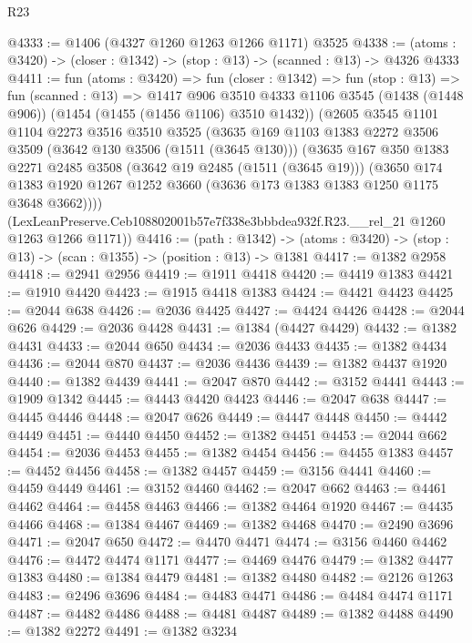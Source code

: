 \begin{lexlean}{R23}
\begin{coremodule}
@4333 := @1406 (@4327 @1260 @1263 @1266 @1171) @3525
@4338 := (atoms : @3420) -> (closer : @1342) -> (stop : @13) -> (scanned : @13) -> @4326 @4333
@4411 := fun (atoms : @3420) =>
  fun (closer : @1342) =>
  fun (stop : @13) =>
  fun (scanned : @13) =>
  @1417
    @906
    @3510
    @4333
    @1106
    @3545
    (@1438 (@1448 @906))
    (@1454 (@1455 (@1456 @1106) @3510 @1432))
    (@2605
      @3545
      @1101
      @1104
      @2273
      @3516
      @3510
      @3525
      (@3635
        @169
        @1103
        @1383
        @2272
        @3506
        @3509
        (@3642 @130 @3506 (@1511 (@3645 @130)))
        (@3635
          @167
          @350
          @1383
          @2271
          @2485
          @3508
          (@3642 @19 @2485 (@1511 (@3645 @19)))
          (@3650
            @174
            @1383
            @1920
            @1267
            @1252
            @3660
            (@3636 @173 @1383 @1383 @1250 @1175 @3648 @3662))))
      (LexLeanPreserve.Ceb108802001b57e7f338e3bbbdea932f.R23.__rel_21 @1260 @1263 @1266 @1171))
@4416 := (path : @1342) ->
  (atoms : @3420) -> (stop : @13) -> (scan : @1355) -> (position : @13) -> @1381
@4417 := @1382 @2958
@4418 := @2941 @2956
@4419 := @1911 @4418
@4420 := @4419 @1383
@4421 := @1910 @4420
@4423 := @1915 @4418 @1383
@4424 := @4421 @4423
@4425 := @2044 @638
@4426 := @2036 @4425
@4427 := @4424 @4426
@4428 := @2044 @626
@4429 := @2036 @4428
@4431 := @1384 (@4427 @4429)
@4432 := @1382 @4431
@4433 := @2044 @650
@4434 := @2036 @4433
@4435 := @1382 @4434
@4436 := @2044 @870
@4437 := @2036 @4436
@4439 := @1382 @4437 @1920
@4440 := @1382 @4439
@4441 := @2047 @870
@4442 := @3152 @4441
@4443 := @1909 @1342
@4445 := @4443 @4420 @4423
@4446 := @2047 @638
@4447 := @4445 @4446
@4448 := @2047 @626
@4449 := @4447 @4448
@4450 := @4442 @4449
@4451 := @4440 @4450
@4452 := @1382 @4451
@4453 := @2044 @662
@4454 := @2036 @4453
@4455 := @1382 @4454
@4456 := @4455 @1383
@4457 := @4452 @4456
@4458 := @1382 @4457
@4459 := @3156 @4441
@4460 := @4459 @4449
@4461 := @3152 @4460
@4462 := @2047 @662
@4463 := @4461 @4462
@4464 := @4458 @4463
@4466 := @1382 @4464 @1920
@4467 := @4435 @4466
@4468 := @1384 @4467
@4469 := @1382 @4468
@4470 := @2490 @3696
@4471 := @2047 @650
@4472 := @4470 @4471
@4474 := @3156 @4460 @4462
@4476 := @4472 @4474 @1171
@4477 := @4469 @4476
@4479 := @1382 @4477 @1383
@4480 := @1384 @4479
@4481 := @1382 @4480
@4482 := @2126 @1263
@4483 := @2496 @3696
@4484 := @4483 @4471
@4486 := @4484 @4474 @1171
@4487 := @4482 @4486
@4488 := @4481 @4487
@4489 := @1382 @4488
@4490 := @1382 @2272
@4491 := @1382 @3234

\end{coremodule}
\end{lexlean}
